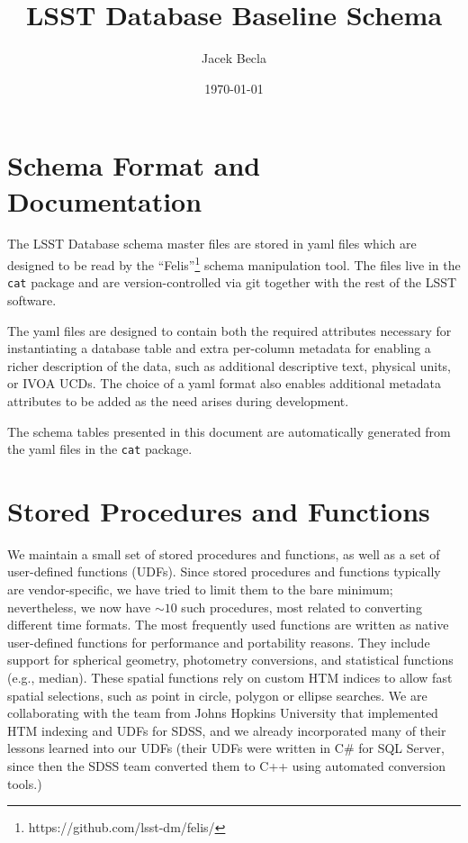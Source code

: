 \documentclass[DM,lsstdraft,toc]{lsstdoc}
\title{LSST Database Baseline Schema}
\author{%
Jacek Becla
}
\date{\today}
\begin{document}
\maketitle

\section{Schema Format and Documentation}

The LSST Database schema master files are stored in yaml files which are designed to be read by the ``Felis''\footnote{https://github.com/lsst-dm/felis/} schema manipulation tool. The files live in the \texttt{cat} package and are version-controlled via git together with the rest of the LSST software.

The yaml files are designed to contain both the required attributes necessary for instantiating a database table and extra per-column metadata for enabling a richer description of the data, such as additional descriptive text, physical units, or IVOA UCDs. The choice of a yaml format also enables additional metadata attributes to be added as the need arises during development.

The schema tables presented in this document are automatically generated from the yaml files in the \texttt{cat} package.

\section{Stored Procedures and Functions}

We maintain a small set of stored procedures and functions, as well as a set of user-defined functions (UDFs). Since stored procedures and functions typically are vendor-specific, we have tried to limit them to the bare minimum; nevertheless, we now have $\sim10$ such procedures, most related to converting different time formats. The most frequently used functions are written as native user-defined functions for performance and portability reasons. They include support for spherical geometry, photometry conversions, and statistical functions (e.g., median). These spatial functions rely on custom HTM indices to allow fast spatial selections, such as point in circle, polygon or ellipse searches. We are collaborating with the team from Johns Hopkins University that implemented HTM indexing and UDFs for SDSS, and we already incorporated many of their lessons learned into our UDFs (their UDFs were written in C\# for SQL Server, since then the SDSS team converted them to C++ using automated conversion tools.)
\end{document}
